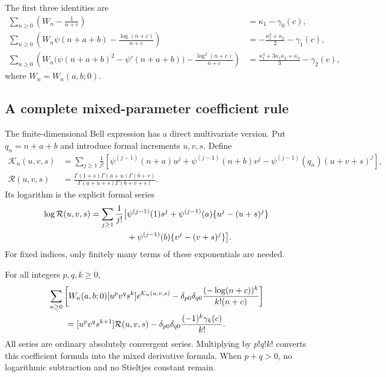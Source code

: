 The first three identities are
\begin{align}
 \sum_{n\ge0}\left(W_n-\frac1{n+c}\right)
 &=\kappa_1-\gamma_0(c),\label{gs:k0}\\
 \sum_{n\ge0}\left(W_n\psi(n+a+b)
                   -\frac{\log(n+c)}{n+c}\right)
 &=-\frac{\kappa_1^2+\kappa_2}{2}-\gamma_1(c),\label{gs:k1}\\
 \sum_{n\ge0}\left(W_n\bigl(\psi(n+a+b)^2-\psi'(n+a+b)\bigr)
                   -\frac{\log^2(n+c)}{n+c}\right)
 &=\frac{\kappa_1^3+3\kappa_1\kappa_2+\kappa_3}{3}
   -\gamma_2(c),\label{gs:k2}
\end{align}
where $W_n=W_n(a,b;0)$.

\subsection{A complete mixed-parameter coefficient rule}

The finite-dimensional Bell expression has a direct multivariate
version.  Put $q_n=n+a+b$ and introduce formal increments $u,v,s$.
Define
\begin{align}
 \mathcal K_n(u,v,s)
 &=\sum_{j\ge1}\frac1{j!}
 \left[\psi^{(j-1)}(n+a)u^j+\psi^{(j-1)}(n+b)v^j
       -\psi^{(j-1)}(q_n)(u+v+s)^j\right],\label{gs:Kn}\\
 \mathcal R(u,v,s)
 &=\frac{\Gamma(1+s)\Gamma(a+u)\Gamma(b+v)}
 {\Gamma(a+u+s)\Gamma(b+v+s)}.\label{gs:mixed-R}
\end{align}
Its logarithm is the explicit formal series
\begin{align}
 \log\mathcal R(u,v,s)
 =\sum_{j\ge1}\frac1{j!}\bigl[&\psi^{(j-1)}(1)s^j
 +\psi^{(j-1)}(a)\{u^j-(u+s)^j\}\notag\\
 &+\psi^{(j-1)}(b)\{v^j-(v+s)^j\}\bigr].\label{gs:mixed-logR}
\end{align}
For fixed indices, only finitely many terms of these exponentials are
needed.

\begin{theorem}\label{gs:mixed-jets}
For all integers $p,q,k\ge0$,
\begin{align}
 &\sum_{n\ge0}\left[
 W_n(a,b;0)[u^pv^qs^k]e^{\mathcal K_n(u,v,s)}
 -\delta_{p0}\delta_{q0}\frac{(-\log(n+c))^k}{k!(n+c)}\right]
 \notag\\
 &\qquad=[u^pv^qs^{k+1}]\mathcal R(u,v,s)
 -\delta_{p0}\delta_{q0}\frac{(-1)^k\gamma_k(c)}{k!}.
 \label{gs:mixed-coefficient}
\end{align}
All series are ordinary absolutely convergent series.  Multiplying by
$p!q!k!$ converts this coefficient formula into the mixed derivative
formula.  When $p+q>0$, no logarithmic subtraction and no Stieltjes
constant remain.
\end{theorem}

